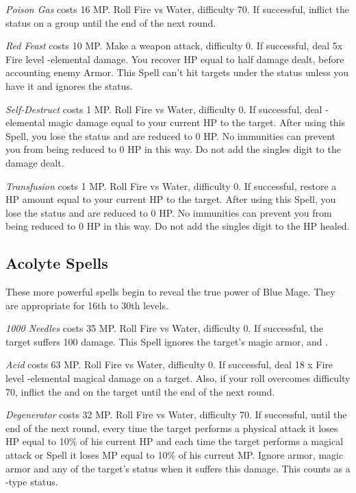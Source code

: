 \begin{multicols}{2}
    \textit{Poison Gas} costs 16 MP\@. Roll Fire vs Water, difficulty 70. If successful, inflict the  status on a group until the end of the next round.
    
    \textit{Red Feast} costs 10 MP\@. Make a weapon attack, difficulty 0. If successful, deal 5x Fire level -elemental damage. You recover HP equal to half damage dealt, before accounting enemy Armor. This Spell can’t hit targets under the  status unless you have it and ignores the  status.
    
    \textit{Self-Destruct} costs 1 MP\@. Roll Fire vs Water, difficulty 0. If successful, deal -elemental magic damage equal to your current HP to the target. After using this Spell, you lose the  status and are reduced to 0 HP\@. No immunities can prevent you from being reduced to 0 HP in this way. Do not add the singles digit to the damage dealt.

    \textit{Transfusion} costs 1 MP\@. Roll Fire vs Water, difficulty 0. If successful, restore a HP amount equal to your current HP to the target. After using this Spell, you lose the  status and are reduced to 0 HP\@. No immunities can prevent you from being reduced to 0 HP in this way. Do not add the singles digit to the HP healed.
    
\subsection{Acolyte Spells}\label{subsec:blue-acolyte}

These more powerful spells begin to reveal the true power of Blue Mage. They are appropriate for 16th to 30th levels.

    \textit{1000 Needles} costs 35 MP\@. Roll Fire vs Water, difficulty 0. If successful, the target suffers 100 damage. This Spell ignores the target’s magic armor,  and .

    \textit{Acid} costs 63 MP\@. Roll Fire vs Water, difficulty 0. If successful, deal 18 x Fire level -elemental magical damage on a target. Also, if your roll overcomes difficulty 70, inflict the  and  on the target until the end of the next round.
    
    \textit{Degenerator} costs 32 MP\@. Roll Fire vs Water, difficulty 70. If successful, until the end of the next round, every time the target performs a physical attack it loses HP equal to 10\% of his current HP and each time the target performs a magical attack or Spell it loses MP equal to 10\% of his current MP\@. Ignore armor, magic armor and any of the target’s status when it suffers this damage. This counts as a -type status.
    

\end{multicols}
